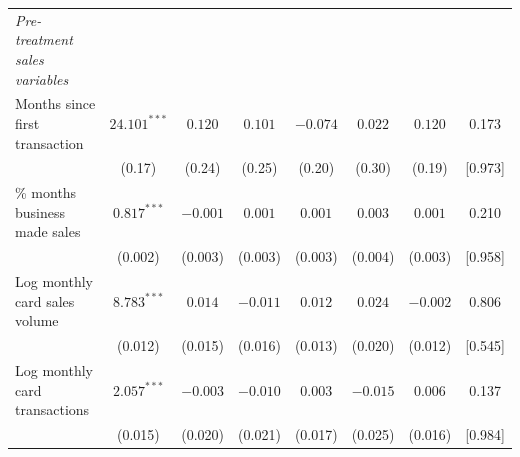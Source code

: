 \begin{tabular}{lccccccc}
\emph{Pre-treatment sales variables} \\
\quad Months since first transaction & $24.101^{***}$ & $0.120$ & $0.101$ & $-0.074$ & $0.022$ & $0.120$ & 0.173\\
 & (0.17) & (0.24) & (0.25) & (0.20) & (0.30) & (0.19) & {}[0.973]\\
\quad \% months business made sales & $0.817^{***}$ & $-0.001$ & $0.001$ & $0.001$ & $0.003$ & $0.001$ & 0.210\\
 & (0.002) & (0.003) & (0.003) & (0.003) & (0.004) & (0.003) & {}[0.958]\\
\quad Log monthly card sales volume & $8.783^{***}$ & $0.014$ & $-0.011$ & $0.012$ & $0.024$ & $-0.002$ & 0.806\\
 & (0.012) & (0.015) & (0.016) & (0.013) & (0.020) & (0.012) & {}[0.545]\\
\quad Log monthly card transactions & $2.057^{***}$ & $-0.003$ & $-0.010$ & $0.003$ & $-0.015$ & $0.006$ & 0.137\\
 & (0.015) & (0.020) & (0.021) & (0.017) & (0.025) & (0.016) & {}[0.984]\\
\bottomrule
\end{tabular}
